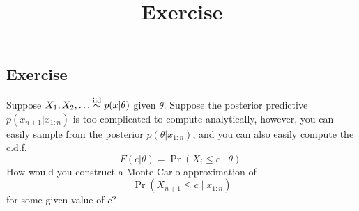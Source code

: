 \documentclass[12pt]{article}
\title{Exercise}
\author{}
\date{}
\begin{document}
\maketitle


\subsection*{Exercise}
Suppose $X_1,X_2,\dotsc\stackrel{\mathrm{iid}}{\sim} p(x|\theta)$ given $\theta$.  Suppose the posterior predictive $p(x_{n+1}|x_{1:n})$ is too complicated to compute analytically, however, you can easily sample from the posterior $p(\theta|x_{1:n})$, and you can also easily compute the c.d.f.\
$$F(c|\theta) = \Pr(X_i\leq c\mid \theta).$$
How would you construct a Monte Carlo approximation of
$$\Pr(X_{n+1}\leq c\mid x_{1:n})$$
for some given value of $c$?
\end{document}
